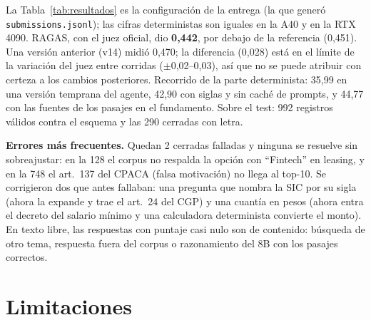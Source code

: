 \documentclass[10pt,twocolumn,letterpaper]{article}
\newcommand{\cod}[1]{\texttt{#1}}
\begin{document}
La Tabla~\ref{tab:resultados} es la configuración de la entrega (la que generó
\cod{submissions.jsonl}); las cifras deterministas son iguales en la A40 y en la RTX
4090. RAGAS, con el juez oficial, dio \textbf{0,442}, por debajo de la referencia
(0,451). Una versión anterior (v14) midió 0,470; la diferencia (0,028) está en el
límite de la variación del juez entre corridas ($\pm$0,02--0,03), así que no se puede
atribuir con certeza a los cambios posteriores. Recorrido de la parte determinista: 35,99 en una versión temprana del agente, 42,90 con siglas y
sin caché de prompts, y 44,77 con las fuentes de los pasajes en el fundamento. Sobre el
test: 992 registros válidos contra el esquema y las 290 cerradas con letra.

\textbf{Errores más frecuentes.} Quedan 2 cerradas falladas y ninguna se resuelve sin
sobreajustar: en la 128 el corpus no respalda la opción con ``Fintech'' en leasing, y en
la 748 el art.~137 del CPACA (falsa motivación) no llega al top-10. Se corrigieron dos
que antes fallaban: una pregunta que nombra la SIC por su sigla (ahora la expande y trae
el art.~24 del CGP) y una cuantía en pesos (ahora entra el decreto del salario mínimo y
una calculadora determinista convierte el monto). En texto libre, las respuestas con
puntaje casi nulo son de contenido: búsqueda de otro tema, respuesta fuera del corpus o
razonamiento del 8B con los pasajes correctos.

\section{Limitaciones}
\end{document}

